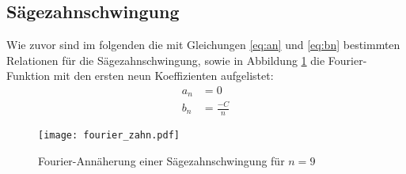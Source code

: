 \subsection{Sägezahnschwingung}
Wie zuvor sind im folgenden die mit Gleichungen \eqref{eq:an} und \eqref{eq:bn} bestimmten Relationen für die Sägezahnschwingung, sowie in Abbildung \ref{fig:vorbereitung_sägezahn} die Fourier-Funktion mit den ersten neun Koeffizienten aufgelistet:
\begin{align*}
    a_n &= 0 \\
    b_n &= \frac{-C}{n}
\end{align*}
\begin{figure}[h]
  \centering
  \texttt{[image: fourier\_zahn.pdf]}
  \caption{Fourier-Annäherung einer Sägezahnschwingung für $n=9$}
  \label{fig:vorbereitung_sägezahn}
\end{figure}